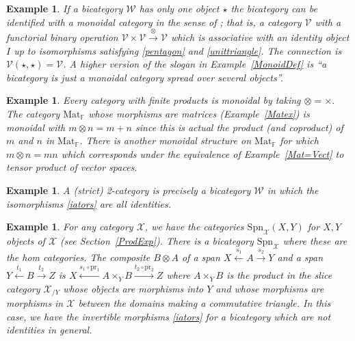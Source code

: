 \documentclass[a4paper,12pt]{article}
\newtheorem{example}[theorem]{Example}
\theoremstyle{step}
\newcommand{\xra}{\xrightarrow}
\newcommand{\xla}{\xleftarrow}
\def\CV{{\mathscr V}}
\def\CW{{\mathscr W}}
\def\CX{{\mathscr X}}
\def\ot{{\otimes}}
\begin{document}
\begin{example} \label{MonoidalcatDef}
If a bicategory $\CW$ has only one object $\star$ the bicategory can be identified with a {\em monoidal category} in the sense of \cite{EilKel1966}; that is, a category $\CV$ with a functorial binary operation $\CV \times \CV\xra{\otimes} \CV$ which is associative with an identity object $I$ up to isomorphisms satisfying \eqref{pentagon} and \eqref{unittriangle}. The connection is $\CV(\star,\star) = \CV$. A higher version of the slogan in Example~\ref{MonoidDef} is ``a bicategory is just a monoidal category spread over several objects''.  
\end{example}
\begin{example} Every category with finite products is monoidal by taking $\otimes = \times$.
The category $\mathrm{Mat}_{\mathbb{F}}$ whose morphisms are matrices (Example~\ref{Matex}) 
is monoidal with $m\otimes n = m+n$ since this is actual the product (and coproduct) of $m$ and $n$
in $\mathrm{Mat}_{\mathbb{F}}$. There is another monoidal structure on $\mathrm{Mat}_{\mathbb{F}}$
for which $m\otimes n = mn$ which corresponds under the equivalence of 
Example~\ref{Mat=Vect} to tensor product of vector spaces.    
\end{example}
\begin{example} A (strict) 2-category is precisely a bicategory $\CW$ in which the isomorphisms \eqref{iators} are all identities.
\end{example}
\begin{example}\label{spanbicatex} For any category $\CX$, we have the categories $\mathrm{Spn}_{\CX}(X,Y)$ for $X, Y$ objects of $\CX$ (see Section~\ref{ProdExp}).
There is a bicategory $\mathrm{Spn}_{\CX}$ where these are the hom categories. 
The composite $B\ot A$ of a span $X\xla{s_1}A\xra{s_2}Y$ and a span $Y\xla{t_1}B\xra{t_2}Z$
is $X\xla{s_1\circ \mathrm{pr}_1}A\times_{Y} B\xra{t_2\circ \mathrm{pr}_2}Z$ where $A\times_{Y} B$
is the product in the {\em slice category} $\CX_{/Y}$ whose objects are morphisms into $Y$
and whose morphisms are morphisms in $\CX$ between the domains making a commutative triangle.
In this case, we have the invertible morphisms \eqref{iators} for a bicategory which are not identities in general.   
\end{example}
\end{document}
